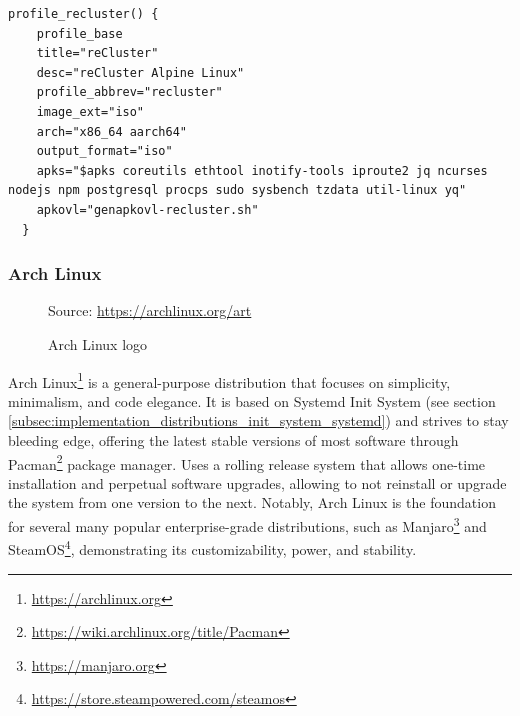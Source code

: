 \begin{lstlisting}[language=shell, morekeywords={[2]{profile_recluster, profile_base}}, morekeywords={[4]{title, desc, profile_abbrev, image_ext, arch, output_format, apks, apkovl}}, xleftmargin=\parindent, label={lst:alpine}, caption=Contents of \texttt{mkimg.recluster.sh} file which shows the reCluster profile definition]
  profile_recluster() {
    profile_base
    title="reCluster"
    desc="reCluster Alpine Linux"
    profile_abbrev="recluster"
    image_ext="iso"
    arch="x86_64 aarch64"
    output_format="iso"
    apks="$apks coreutils ethtool inotify-tools iproute2 jq ncurses nodejs npm postgresql procps sudo sysbench tzdata util-linux yq"
    apkovl="genapkovl-recluster.sh"
  }
\end{lstlisting}

\subsubsection{Arch Linux}
\label{subsubsec:implementation_distributions_iso_arch_linux}

\begin{figure} %
  \centering
  \def\stackalignment{r} %
  {\scriptsize \parbox[t]{\linewidth}{ Source: \url{https://archlinux.org/art}} }
  \caption{Arch Linux logo}
\end{figure}

Arch Linux\footnote{\url{https://archlinux.org}} is a general-purpose
distribution that focuses on simplicity, minimalism, and code elegance. It is based
on Systemd Init System (see section
\ref{subsec:implementation_distributions_init_system_systemd}) and strives to stay
bleeding edge, offering the latest stable versions of most software through
Pacman\footnote{\url{https://wiki.archlinux.org/title/Pacman}} package manager. Uses
a rolling release system that allows one-time installation and perpetual software
upgrades, allowing to not reinstall or upgrade the system from one version to
the next. Notably, Arch Linux is the foundation for several many popular
enterprise-grade distributions, such as Manjaro\footnote{\url{https://manjaro.org}}
and SteamOS\footnote{\url{https://store.steampowered.com/steamos}},
demonstrating its customizability, power, and stability\cite{arch_linux}.

